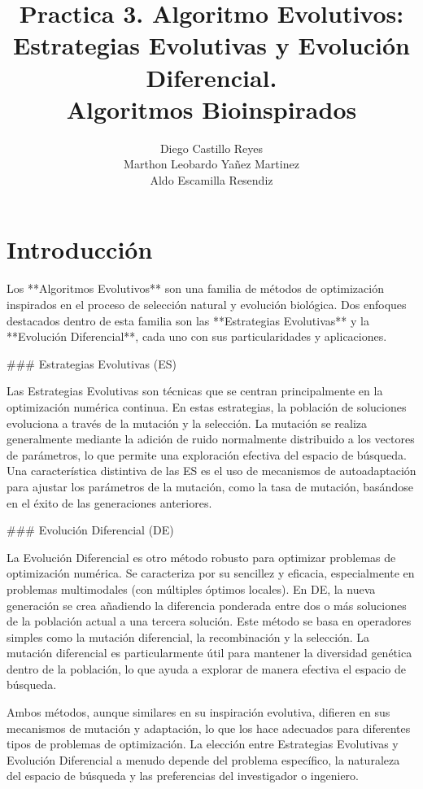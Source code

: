 \documentclass{report}
\title{\Huge{\textbf{Practica 3. Algoritmo Evolutivos: Estrategias Evolutivas y Evolución Diferencial.}}\\
\Large{\textbf{Algoritmos Bioinspirados}}}
\author{Diego Castillo Reyes\\Marthon Leobardo Yañez Martinez\\Aldo Escamilla Resendiz}
\begin{document}
    \maketitle
    \tableofcontents
    \newpage
    \section{Introducción}
    Los **Algoritmos Evolutivos** son una familia de métodos de optimización inspirados en el proceso de selección natural y evolución biológica. Dos enfoques destacados dentro de esta familia son las **Estrategias Evolutivas** y la **Evolución Diferencial**, cada uno con sus particularidades y aplicaciones.

### Estrategias Evolutivas (ES)

Las Estrategias Evolutivas son técnicas que se centran principalmente en la optimización numérica continua. En estas estrategias, la población de soluciones evoluciona a través de la mutación y la selección. La mutación se realiza generalmente mediante la adición de ruido normalmente distribuido a los vectores de parámetros, lo que permite una exploración efectiva del espacio de búsqueda. Una característica distintiva de las ES es el uso de mecanismos de autoadaptación para ajustar los parámetros de la mutación, como la tasa de mutación, basándose en el éxito de las generaciones anteriores.

### Evolución Diferencial (DE)

La Evolución Diferencial es otro método robusto para optimizar problemas de optimización numérica. Se caracteriza por su sencillez y eficacia, especialmente en problemas multimodales (con múltiples óptimos locales). En DE, la nueva generación se crea añadiendo la diferencia ponderada entre dos o más soluciones de la población actual a una tercera solución. Este método se basa en operadores simples como la mutación diferencial, la recombinación y la selección. La mutación diferencial es particularmente útil para mantener la diversidad genética dentro de la población, lo que ayuda a explorar de manera efectiva el espacio de búsqueda.

Ambos métodos, aunque similares en su inspiración evolutiva, difieren en sus mecanismos de mutación y adaptación, lo que los hace adecuados para diferentes tipos de problemas de optimización. La elección entre Estrategias Evolutivas y Evolución Diferencial a menudo depende del problema específico, la naturaleza del espacio de búsqueda y las preferencias del investigador o ingeniero.
\end{document}
